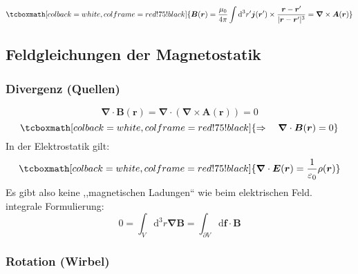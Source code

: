 \documentclass[titlepage,11pt,a4paper,ngerman]{report}
\newcommand{\tx}[1]{\textrm{#1}}
\newcommand{\dd}{\tx{d}}
\renewcommand{\vec}[1]{\boldsymbol{#1}}
\renewcommand{\epsilon}{\varepsilon}
\newcommand{\vabla}{\boldsymbol{\nabla}}
\newcommand{\rmbox}[1]{\tcboxmath[colback=white,colframe=red!75!black]{#1}}
\begin{document}

\begin{equation*}
\rmbox{\vec{B}(\vec{r}) = \frac{\mu_0}{4 \pi} \int \dd ^3 r' \vec{j}(\vec{r}') \times \frac{\vec{r} - \vec{r}'}{|\vec{r} - \vec{r}'|^3} = \vabla \times \vec{A}(\vec{r})}
\end{equation*}

\subsection{Feldgleichungen der Magnetostatik}

\subsubsection{Divergenz (Quellen)}

\begin{equation*}
\vabla \cdot \vec{B}(\vec{r}) = \vabla \cdot (\vabla \times \vec{A}(\vec{r})) = 0
\end{equation*}
\begin{equation*}
\rmbox{\Rightarrow \quad \vabla \cdot \vec{B}(\vec{r}) = 0}
\end{equation*}
In der Elektrostatik gilt:
\begin{equation*}
\rmbox{\vabla \cdot \vec{E}(\vec{r}) = \frac{1}{\epsilon_0} \rho(\vec{r})}
\end{equation*}
Es gibt also keine ,,magnetischen Ladungen`` wie beim elektrischen Feld.\\[5pt]
integrale Formulierung:
\begin{equation*}
0 = \int_V \dd^3 r \vabla \vec{B} = \int_{\partial V} \dd \vec{f} \cdot \vec{B}
\end{equation*}

\subsubsection{Rotation (Wirbel)}
\end{document}
